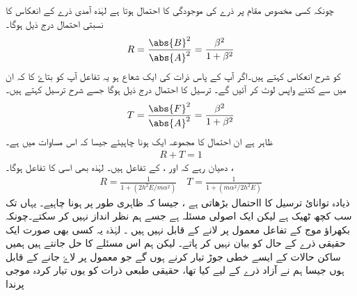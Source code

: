 چونکہ کسی مخصوص مقام پر ذرے کی موجودگی کا احتمال  ہوتا ہے لہٰذہ آمدی ذرے کے انعکاس کا نسبتی احتمال درج ذیل ہوگا۔ 
\begin{align}
R=\frac{\abs{B}^{2}}{\abs{A}^{2}}=\frac{\beta^{2}}{1+\beta^{2}}
\end{align}
 کو شرح انعکاس کہتے ہیں۔اگر آپ کے پاس ذرات کی ایک شعاع ہو یہ تفاعل آپ کو بتاۓ کا کہ ان میں سے کتنے واپس لوٹ کر آئیں گے۔ ترسیل کا احتمال درج ذیل ہوگا جسے شرح ترسیل کہتے ہیں۔ 
\begin{align}
T=\frac{\abs{F}^{2}}{\abs{A}^{2}}=\frac{\beta^{2}}{1+\beta^{2}}
\end{align}
ظاہر ہے ان احتمال کا مجموعہ ایک ہونا چاہیئے جیسا کہ اس مساوات میں ہے۔
\begin{align}
R+T=1
\end{align}
دھیان رہے کہ  اور ،   کے تفاعل ہیں۔ لہٰذہ   بھی اسی کا تفاعل ہوگا۔
،  
\begin{align}
R=\frac{1}{1+(2h^{2}E/m\alpha^{2})}\quad T=\frac{1}{1+(m\alpha^{2}/2h^{2}E)}
\end{align}
ذیادہ توانائ ترسیل کا ااحتمال بڑھاتی ہے ، جیسا کہ ظاہری طور پر ہونا چاہیے۔ یہاں تک سب کچھ ٹھیک ہے لیکن ایک اصولی مسئلہ ہے جسے ہم نظر انداز نہیں کر سکتے۔چونکہ بکھراؤ موج کے تفاعل معمول پر لانے کے قابل نہیں ہیں ۔ لہٰذہ یہ کسی بھی صورت ایک حقیقی ذرے کے حال کو بیان نہیں کر پاتے۔ لیکن ہم اس مسئلے کا حل جانتے ہیں ہمیں ساکن حالات کے ایسے خطی جوڑ تیار کرنے ہوں گے جو معمول پر لاۓ جانے کے قابل ہوں جیسا ہم نے آزاد ذرے کے لیے کیا تھا، حقیقی طبعی ذرات کو یوں تیار کردہ موجی پرندا 



